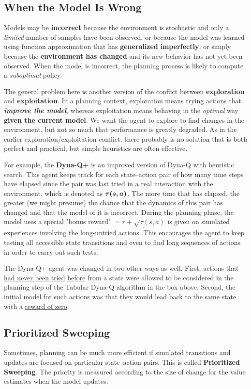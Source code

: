 \documentclass[11pt]{article}
\begin{document}
\subsection{When the Model Is Wrong}
Models may be \textbf{incorrect} because the environment is stochastic and only a \emph{limited} number of samples have been observed, or because the model was learned using function approximation that has \textbf{generalized} \textbf{imperfectly}, or simply because the \textbf{environment has changed} and its new behavior has not yet been observed. When the model is incorrect, the planning process is likely to compute a \emph{suboptimal} policy.

The general problem here is another version of the conflict between \textbf{exploration} and \textbf{exploitation}. In a planning context, exploration means trying actions that \emph{\textbf{improve the model}}, whereas exploitation means behaving in the \emph{optimal} way \textbf{given the current model}. We want the agent to explore to find changes in the environment, but not so much that performance is greatly degraded. As in the earlier exploration/exploitation conflict, there probably is no solution that is both perfect and practical, but simple heuristics are often effective.

For example, the \textbf{Dyna-Q+} is an improved version of Dyna-Q with heuristic search.  This agent keeps track for each state–action pair of how many time steps have elapsed since the pair was last tried in a real interaction with the environment, which is denoted as {$\boldsymbol{\tau(s, a)}$}. The more time that has elapsed, the greater (we might presume) the chance that the dynamics of this pair has changed and that the model of it is incorrect. During the planning phase, the model uses a special "bonus reward" $=\underline{r+\sqrt{\tau(s, a)}}$ is given on simulated experiences involving the long-untried actions. This encourages the agent to keep testing all accessible state transitions and even to find long sequences of actions in order to carry out such tests.

The Dyna-Q+ agent was changed in two other ways as well. First, actions that \underline{had never been tried} \underline{before} from a state were allowed to be considered in the planning step of the Tabular Dyna-Q algorithm in the box above. Second, the initial model for such actions was that they would \underline{lead back to the same state} with a \underline{reward of zero}.

\subsection{Prioritized Sweeping}
Sometimes, planning can be much more efficient if simulated transitions and updates are focused on particular state–action pairs.  This is called \textbf{Prioritized Sweeping}. The priority is measured according to the size of change for the value estimates when the model updates.
\end{document}
